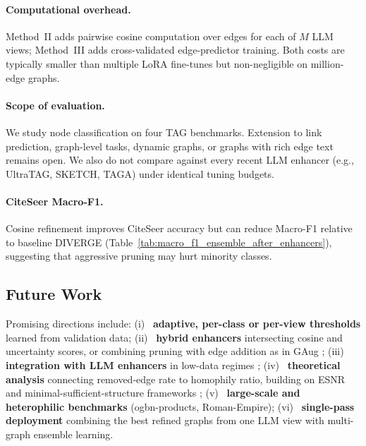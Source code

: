 \documentclass{article}
\begin{document}
\paragraph{Computational overhead.}
Method~II adds pairwise cosine computation over edges for each of $M$ LLM views;
Method~III adds cross-validated edge-predictor training. Both costs are typically
smaller than multiple LoRA fine-tunes but non-negligible on million-edge graphs.

\paragraph{Scope of evaluation.}
We study node classification on four TAG benchmarks. Extension to link prediction,
graph-level tasks, dynamic graphs, or graphs with rich edge text remains open. We also
do not compare against every recent LLM enhancer (e.g., UltraTAG, SKETCH, TAGA)
\citep{yu2025ultratag,zhou-etal-2025sketch,zhang2025taga} under identical tuning budgets.

\paragraph{CiteSeer Macro-F1.}
Cosine refinement improves CiteSeer accuracy but can reduce Macro-F1 relative to
baseline DIVERGE (Table~\ref{tab:macro_f1_ensemble_after_enhancers}), suggesting that
aggressive pruning may hurt minority classes.


\subsection{Future Work}
\label{sec:disc-future}

Promising directions include:
(i)~ \textbf{adaptive, per-class or per-view thresholds} learned from validation data;
(ii)~ \textbf{hybrid enhancers} intersecting cosine and uncertainty scores, or combining
pruning with edge addition as in GAug \citep{zhao2021gaug};
(iii)~ \textbf{integration with LLM enhancers} in low-data regimes
\citep{zhang2025leveraging,hu2025gaga};
(iv)~ \textbf{theoretical analysis} connecting removed-edge rate to homophily ratio,
building on ESNR and minimal-sufficient-structure frameworks
\citep{dong2023gps,fatemi2022cogsl};
(v)~ \textbf{large-scale and heterophilic benchmarks} (ogbn-products, Roman-Empire);
(vi)~ \textbf{single-pass deployment} combining the best refined graphs from one LLM
view with multi-graph ensemble learning.


\end{document}
